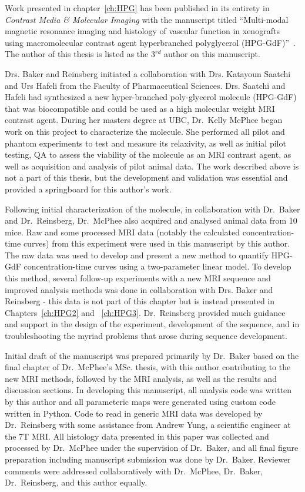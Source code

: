 Work presented in chapter~\ref{ch:HPG} has been published in its entirety in \emph{Contrast Media \& Molecular Imaging} with the manuscript titled ``Multi-modal magnetic resonance imaging and histology of vascular function in xenografts using macromolecular contrast agent hyperbranched polyglycerol (\acs{HPG-GdF})''~\cite{Baker:2015cob}.
The author of this thesis is listed as the 3$^{rd}$ author on this manuscript.

Drs. Baker and Reinsberg initiated a collaboration with Drs. Katayoun Saatchi and Urs Hafeli from the Faculty of Pharmaceutical Sciences.
Drs. Saatchi and Hafeli had synthesized a new hyper-branched poly-glycerol molecule (\acs{HPG-GdF}) that was biocompatible and could be used as a high molecular weight MRI contrast agent.
During her masters degree at UBC, Dr.\ Kelly McPhee began work on this project to characterize the molecule. 
She performed all pilot and phantom experiments to test and measure its relaxivity, as well as initial pilot testing, QA to assess the viability of the molecule as an MRI contrast agent, as well as acquisition and analysis of pilot animal data.
The work described above is not a part of this thesis, but the development and validation was essential and provided a springboard for this author's work.

Following initial characterization of the molecule, in collaboration with Dr.\ Baker and Dr.\ Reinsberg, Dr.\ McPhee also acquired and analysed animal data from 10 mice. 
Raw and some processed MRI data (notably the calculated concentration-time curves) from this experiment were used in this manuscript by this author.
The raw data was used to develop and present a new method to quantify \acs{HPG-GdF} concentration-time curves using a two-parameter linear model.
To develop this method, several follow-up experiments with a new MRI sequence and improved analysis methods was done in collaboration with Drs. Baker and Reinsberg - this data is not part of this chapter but is instead presented in Chapters~\ref{ch:HPG2} and ~\ref{ch:HPG3}.
Dr.\ Reinsberg provided much guidance and support in the design of the experiment, development of the sequence, and in troubleshooting the myriad problems that arose during sequence development.

Initial draft of the manuscript was prepared primarily by Dr.\ Baker based on the final chapter of Dr.\ McPhee's MSc. thesis, with this author contributing to the new MRI methods, followed by the MRI analysis, as well as the results and discussion sections. 
In developing this manuscript, all analysis code was written by this author and all parameteric maps were generated using custom code written in Python.
Code to read in generic MRI data was developed by Dr.\ Reinsberg with some assistance from Andrew Yung, a scientific engineer at the 7T MRI.
All histology data presented in this paper was collected and processed by Dr.\ McPhee under the supervision of Dr.\ Baker, and all final figure preparation including manuscript submission was done by Dr.\ Baker.
Reviewer comments were addressed collaboratively with Dr.\ McPhee, Dr.\ Baker, Dr.\ Reinsberg, and this author equally.

